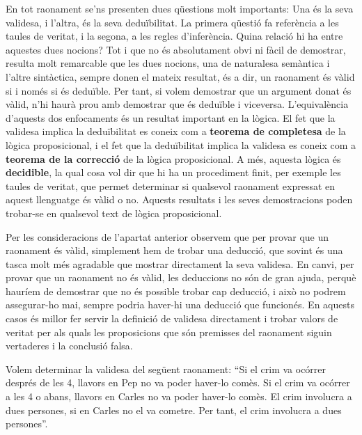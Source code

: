 En tot raonament se'ns presenten dues qüestions molt importants: Una
és la seva validesa, i l'altra, és la seva deduïbilitat. La
primera qüestió fa referència a les taules de veritat, i la
segona, a les regles d'inferència. Quina relació hi ha entre
aquestes dues nocions? Tot i que no és absolutament obvi ni fàcil de
demostrar, resulta molt remarcable que les dues nocions, una de naturalesa
semàntica i l'altre sintàctica, sempre donen el mateix resultat,
és a dir, un raonament és vàlid si i només si és deduïble. Per tant, si volem demostrar que un argument donat és vàlid, n'hi haurà prou amb demostrar que és deduïble i viceversa.
L'equivalència d'aquests dos enfocaments és un resultat important en
la lògica. El fet que la validesa implica la deduïbilitat es coneix
com a \textbf{teorema de completesa} de la lògica proposicional, i el
fet que la deduïbilitat implica la validesa es coneix com a \textbf{teorema de la correcció} de la lògica proposicional. A més,
aquesta lògica és \textbf{decidible}, la qual cosa vol dir que hi ha
un procediment finit, per exemple les taules de veritat, que permet determinar
si qualsevol raonament expressat en aquest llenguatge és vàlid o no. Aquests
resultats i les seves demostracions poden trobar-se
en qualsevol text de lògica proposicional.

\bigskip

Per les consideracions de l'apartat anterior observem que per provar que un
raonament és vàlid, simplement hem de trobar una deducció, que
sovint és una tasca molt més agradable que mostrar directament la
seva validesa. En canvi, per provar que un raonament no és vàlid,
les deduccions no són de gran ajuda, perquè hauríem de
demostrar que no és possible trobar cap deducció, i això no
podrem assegurar-ho mai, sempre podria haver-hi una deducció que funcionés. En aquests casos és millor fer servir la definició de
validesa directament i trobar valors de veritat per als quals les
proposicions que són premisses del raonament siguin vertaderes i la
conclusió falsa.

\begin{exemple}
Volem determinar la validesa del següent raonament: \enquote{Si
el crim va ocórrer després de les 4, llavors en Pep no va poder
haver-lo comès. Si el crim va ocórrer a les 4 o abans, llavors en
Carles no va poder haver-lo comès. El crim involucra a dues persones, si
en Carles no el va cometre. Per tant, el crim involucra a dues
persones}.
\end{exemple}


